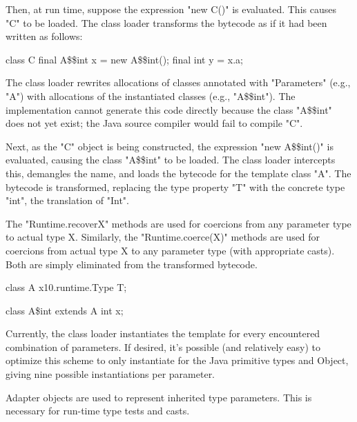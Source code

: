 Then, at run time, suppose the expression \xcd"new C()" is
evaluated.  This causes \xcd"C" to be loaded.
The class loader transforms the bytecode as if it had
been written as follows:

{\footnotesize
\begin{xten}
class C {
    final A\$\$int x = new A\$\$int();
    final int y = x.a;
}
\end{xten}}

The class loader rewrites allocations of classes
annotated with \xcd"Parameters" (e.g., \xcd"A") with allocations of the
instantiated classes (e.g., \xcd"A\$\$int").
The implementation cannot generate this code directly because
the class \xcd"A\$\$int" does not yet exist; the Java source compiler
would fail to compile \xcd"C".

Next, as the \xcd"C" object is being constructed, the expression
\xcd"new A\$\$int()" is evaluated, causing the class \xcd"A\$\$int" to
be loaded.  The class loader intercepts
this, demangles the name, and loads the bytecode for the
template class \xcd"A".
The bytecode is transformed, replacing the type property \xcd"T"
with the concrete type \xcd"int", the translation of \xcd"Int".

The \xcd"Runtime.recoverX" methods are used
for coercions from any parameter type to actual
type X.  Similarly, the \xcd"Runtime.coerce(X)"
methods are used for coercions from actual type
X to any parameter type (with appropriate casts).
Both are simply eliminated from the transformed
bytecode.

{\footnotesize
\begin{xten}
class A {
    x10.runtime.Type T;
}

class A\$int extends A {
    int x;
}
\end{xten}}

Currently, the class loader instantiates the template for
every encountered combination of parameters.  If desired,
it's possible (and relatively easy) to optimize this scheme
to only instantiate for the Java primitive types and Object,
giving nine possible instantiations per parameter.

Adapter objects are used to represent inherited type
parameters.  This is necessary for run-time type tests
and casts.

%

